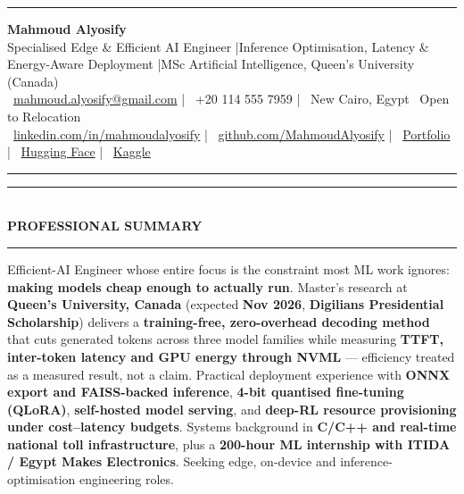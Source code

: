 \documentclass[10pt, a4paper]{article}
\newcommand{\faEnvelope}{}\newcommand{\faPhone}{}\newcommand{\faMapMarker}{}%
\newcommand{\faLinkedin}{}\newcommand{\faGithub}{}\newcommand{\faRobot}{}%
\newcommand{\faChartBar}{}\newcommand{\faGlobe}{}%
\newcommand{\cvsection}[1]{%
  \vspace{3pt}%
  {\color{navy}\rule{\linewidth}{1.1pt}}\\[0.5pt]%
  {\color{navy}\bfseries\fontsize{9.5}{11}\selectfont\uppercase{#1}}\\[-4pt]%
  {\color{teal}\rule{\linewidth}{0.6pt}}%
  \vspace{2pt}%
}
\begin{document}
\small

{\color{navy}\rule{\linewidth}{1.5pt}}

\vspace{3pt}
\begin{center}
  {\fontsize{21}{24}\bfseries\color{navy} Mahmoud Alyosify}\\[3pt]
  {\fontsize{10}{12}\color{teal}
    Specialised Edge \& Efficient AI Engineer \enspace|\enspace Inference Optimisation, Latency \& Energy-Aware Deployment
    \enspace|\enspace MSc Artificial Intelligence, Queen's University (Canada)
}\\[4pt]
  {\color{midgray}
    \faEnvelope\ \href{mailto:mahmoud.alyosify@gmail.com}{mahmoud.alyosify@gmail.com}
    \enspace|\enspace
    \faPhone\ +20 114 555 7959
    \enspace|\enspace
    \faMapMarker\ New Cairo, Egypt \textperiodcentered\ Open to Relocation}\\[2pt]
  {\faLinkedin\ \href{https://linkedin.com/in/mahmoudalyosify}{linkedin.com/in/mahmoudalyosify}
    \enspace|\enspace
    \faGithub\ \href{https://github.com/MahmoudAlyosify}{github.com/MahmoudAlyosify}
    \enspace|\enspace
    \faGlobe\ \href{https://mahmoudalyosifysite.github.io/}{Portfolio}
    \enspace|\enspace
    \faRobot\ \href{https://huggingface.co/mahmoudalyosify}{Hugging Face}
    \enspace|\enspace
    \faChartBar\ \href{https://kaggle.com/mahmoudalyosify}{Kaggle}}
\end{center}

{\color{navy}\rule{\linewidth}{1.5pt}}

\vspace{2pt}

\cvsection{Professional Summary}

{\color{darkgray}\justifying
Efficient-AI Engineer whose entire focus is the constraint most ML work ignores: \textbf{making models cheap enough to actually run}. Master's research at \textbf{Queen's University, Canada} (expected \textbf{Nov 2026}, \textbf{Digilians Presidential Scholarship}) delivers a \textbf{training-free, zero-overhead decoding method} that cuts generated tokens across three model families while measuring \textbf{TTFT, inter-token latency and GPU energy through NVML} --- efficiency treated as a measured result, not a claim. Practical deployment experience with \textbf{ONNX export and FAISS-backed inference}, \textbf{4-bit quantised fine-tuning (QLoRA)}, \textbf{self-hosted model serving}, and \textbf{deep-RL resource provisioning under cost--latency budgets}. Systems background in \textbf{C/C++ and real-time national toll infrastructure}, plus a \textbf{200-hour ML internship with ITIDA / Egypt Makes Electronics}. Seeking edge, on-device and inference-optimisation engineering roles.}
\end{document}
